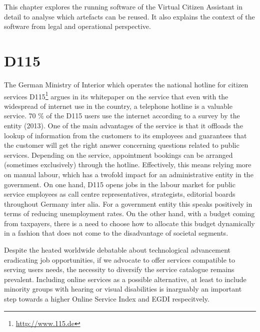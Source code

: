 This chapter explores the running software of the Virtual Citizen Assistant in detail to analyse which artefacts can be reused. It also explains the context of the software from legal and operational perspective.

\section{D115}
\label{d115}
The German Ministry of Interior which operates the national hotline for citizen services D115\footnote{\url{http://www.115.de}} argues in its whitepaper on the service\cite{d115} that even with the widespread of internet use in the country, a telephone hotline is a valuable service. 70 \% of the D115 users use the internet according to a survey by the entity (2013). One of the main advantages of the service is that it offloads the lookup of information from the customers to its employees and guarantees that the customer will get the right answer concerning questions related to public services. Depending on the service, appointment bookings can be arranged (sometimes exclusively) through the hotline. Effectively, this means relying more on manual labour, which has a twofold impact for an administrative entity in the government. On one hand, D115 opens jobs in the labour market for public service employees as call centre representatives, strategists, editorial boards throughout Germany inter alia. For a government entity this speaks positively in terms of reducing unemployment rates. On the other hand, with a budget coming from taxpayers, there is a need to choose how to allocate this budget dynamically in a fashion that does not come to the disadvantage of societal segments.

Despite the heated worldwide debatable about technological advancement eradicating job opportunities, if we advocate to offer services compatible to serving users needs, the necessity to diversify the service catalogue remains prevalent. Including online services as a possible alternative, at least to include minority groups with hearing or visual disabilities is inarguably an important step towards a higher Online Service Index and EGDI respecitvely.

